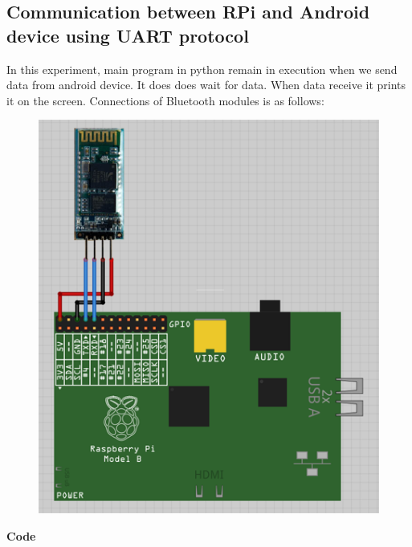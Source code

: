\documentclass[11pt,a4paper]{article}
\begin{document}
	\subsection{Communication between RPi and Android device using UART protocol}  
	In this experiment, main program in python remain in execution when we send data from android device. It does does wait for data. When data receive it prints it on the screen.
	\newpage
	Connections of Bluetooth modules is as follows:\\
	\vspace{5mm}
	\begin{figure}
		\centering
		\includegraphics[scale = 0.4]{bluetooth.png}
	\end{figure}
	\textbf{Code}
	\vspace{0.3cm}
	 
	
\end{document}
